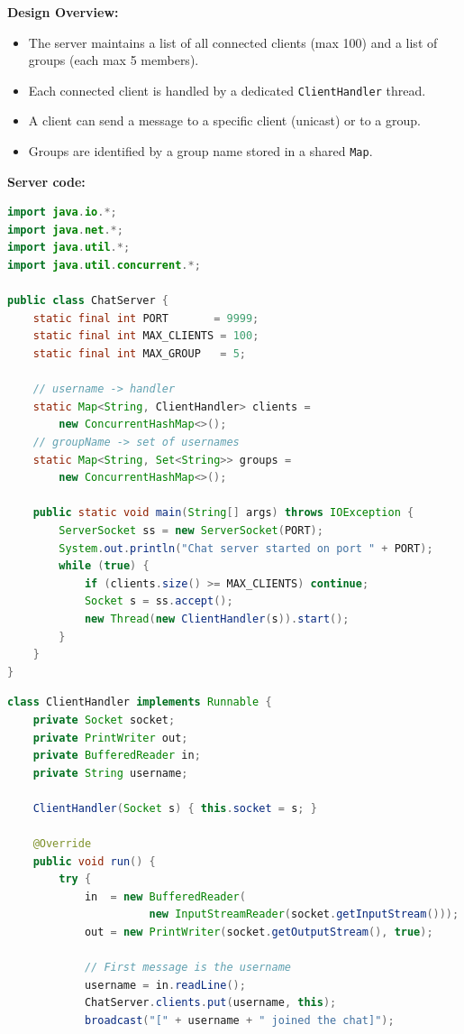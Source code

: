 \documentclass[12pt,a3paper]{article}
\begin{document}
\begin{enumerate}
\begin{tcolorbox}
\textbf{Design Overview:}
\begin{itemize}[itemsep=2pt]
  \item The server maintains a list of all connected
  clients (max 100) and a list of groups (each max 5
  members).
  \item Each connected client is handled by a dedicated
  \texttt{ClientHandler} thread.
  \item A client can send a message to a specific client
  (unicast) or to a group.
  \item Groups are identified by a group name stored in
  a shared \texttt{Map}.
\end{itemize}

\medskip
\textbf{Server code:}

\begin{lstlisting}[language=Java]
import java.io.*;
import java.net.*;
import java.util.*;
import java.util.concurrent.*;

public class ChatServer {
    static final int PORT       = 9999;
    static final int MAX_CLIENTS = 100;
    static final int MAX_GROUP   = 5;

    // username -> handler
    static Map<String, ClientHandler> clients =
        new ConcurrentHashMap<>();
    // groupName -> set of usernames
    static Map<String, Set<String>> groups =
        new ConcurrentHashMap<>();

    public static void main(String[] args) throws IOException {
        ServerSocket ss = new ServerSocket(PORT);
        System.out.println("Chat server started on port " + PORT);
        while (true) {
            if (clients.size() >= MAX_CLIENTS) continue;
            Socket s = ss.accept();
            new Thread(new ClientHandler(s)).start();
        }
    }
}
\end{lstlisting}

\begin{lstlisting}[language=Java]
class ClientHandler implements Runnable {
    private Socket socket;
    private PrintWriter out;
    private BufferedReader in;
    private String username;

    ClientHandler(Socket s) { this.socket = s; }

    @Override
    public void run() {
        try {
            in  = new BufferedReader(
                      new InputStreamReader(socket.getInputStream()));
            out = new PrintWriter(socket.getOutputStream(), true);

            // First message is the username
            username = in.readLine();
            ChatServer.clients.put(username, this);
            broadcast("[" + username + " joined the chat]");


\end{lstlisting}
\end{tcolorbox}
\end{enumerate}
\end{document}
